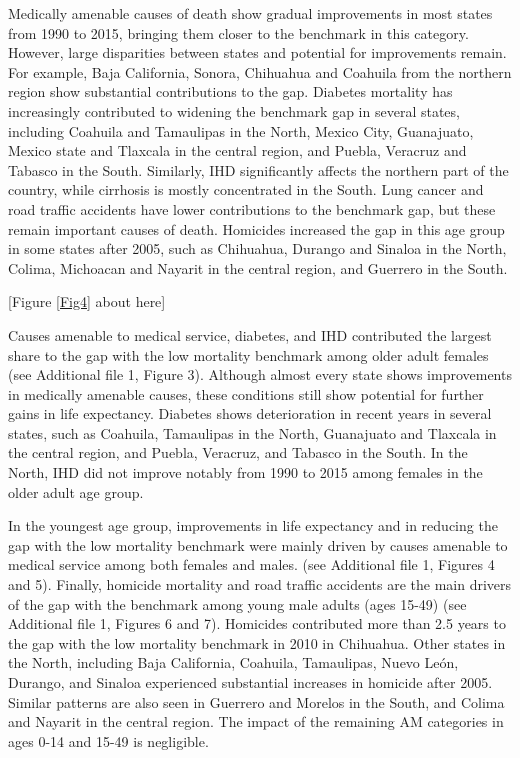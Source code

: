 \documentclass{bmcart}
\begin{document}
Medically amenable causes of death show gradual improvements in most states from 1990 to 2015, bringing them closer to the benchmark in this category. However, large disparities between states and potential for improvements remain. For example, Baja California, Sonora, Chihuahua and Coahuila from the northern region show substantial contributions to the gap. Diabetes mortality has increasingly contributed to widening the benchmark gap in several states, including Coahuila and Tamaulipas in the North, Mexico City, Guanajuato, Mexico state and Tlaxcala in the central region, and Puebla, Veracruz and Tabasco in the South. Similarly, IHD significantly affects the northern part of the country, while cirrhosis is mostly concentrated in the South. Lung cancer and road traffic accidents have lower contributions to the benchmark gap, but these remain important causes of death. Homicides increased the gap in this age group in some states after 2005, such as Chihuahua, Durango and Sinaloa in the North, Colima, Michoacan and Nayarit in the central region, and Guerrero in the South.

\begin{center}
[Figure \ref{Fig4} about here]
\end{center}

Causes amenable to medical service, diabetes, and IHD contributed the largest share to the gap with the low mortality benchmark among older adult females (see Additional file 1, Figure 3). Although almost every state shows improvements in medically amenable causes, these conditions still show potential for further gains in life expectancy. Diabetes shows deterioration in recent years in several states, such as Coahuila, Tamaulipas in the North, Guanajuato and Tlaxcala in the central region, and Puebla, Veracruz, and Tabasco in the South. In the North, IHD did not improve notably from 1990 to 2015 among females in the older adult age group.

In the youngest age group, improvements in life expectancy and in reducing the gap with the low mortality benchmark were mainly driven by causes amenable to medical service among both females and males.  (see Additional file 1, Figures 4 and 5). Finally, homicide mortality and road traffic accidents are the main drivers of the gap with the benchmark among young male adults (ages 15-49) (see Additional file 1, Figures 6 and 7). Homicides contributed more than 2.5 years to the gap with the low mortality benchmark in 2010 in Chihuahua. Other states in the North, including Baja California, Coahuila, Tamaulipas, Nuevo Le\'on, Durango, and Sinaloa experienced substantial increases in homicide after 2005. Similar patterns are also seen in Guerrero and Morelos in the South, and Colima and Nayarit in the central region. The impact of the remaining AM categories in ages 0-14 and 15-49 is negligible. \\
\end{document}
